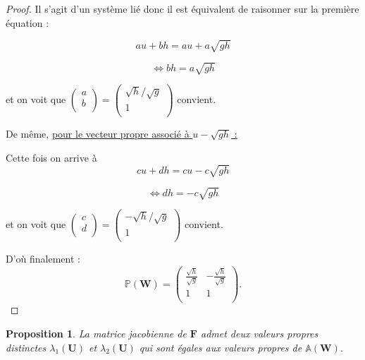 \documentclass[
11pt, %
francais, %
singlespacing, %
headsepline, %
]{MastersDoctoralThesis} %
\newtheorem{prop}{Proposition}
\begin{document}
\begin{proof}
Il s'agit d'un système lié donc il est équivalent de raisonner sur la première équation :

$$au+bh = au+ a\sqrt{gh}$$

$$\Leftrightarrow bh = a\sqrt{gh}$$


et on voit que $\begin{pmatrix}
   a\\
   b\\
\end{pmatrix} = \begin{pmatrix}
   \sqrt{h}/\sqrt{g}\\
   1\\
\end{pmatrix}$ convient.

De même, \underline{pour le vecteur propre associé à $u -\sqrt{gh}$ :}


Cette fois on arrive à $$cu+dh = cu- c\sqrt{gh}$$

$$\Leftrightarrow dh = -c\sqrt{gh}$$


et on voit que $\begin{pmatrix}
   c\\
   d\\
\end{pmatrix} = \begin{pmatrix}
   -\sqrt{h}/\sqrt{g}\\
   1\\
\end{pmatrix}$ convient.


D'où finalement : $$\mathbb{P}(\textbf{W}) =\begin{pmatrix}
   \frac{\sqrt{h}}{\sqrt{g}} & -\frac{\sqrt{h}}{\sqrt{g}} \\
   1 & 1  \\
\end{pmatrix}.$$

\end{proof}


\begin{prop}

La matrice jacobienne de $\textbf{F}$ admet deux valeurs propres distinctes $\lambda_{1}(\textbf{U})$ et $\lambda_{2}(\textbf{U})$  qui sont égales aux valeurs 
propres de $\mathbb{A}(\textbf{W}).$

\end{prop}
\end{document}

